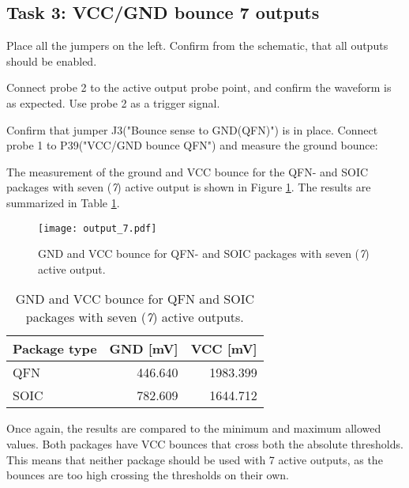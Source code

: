\documentclass[../main.tex]{subfiles}
\begin{document}
\subsection{Task 3: VCC/GND bounce 7 outputs}

Place all the jumpers on the left. Confirm from the schematic, that all outputs should be enabled.

\vspace{10pt}

Connect probe 2 to the active output probe point, and confirm the waveform is as expected. Use probe 2 as a trigger signal.

\vspace{10pt}

Confirm that jumper J3("Bounce sense to GND(QFN)") is in place. Connect probe 1 to P39("VCC/GND bounce QFN") and measure the ground bounce:

\solution

The measurement of the ground and VCC bounce for the QFN- and SOIC packages with seven (\textit{7}) active output is shown in Figure \ref{fig:gnd_vcc_output_7}. The results are summarized in Table \ref{tab:output_7}.

\begin{figure}[h]
    \centering
    \texttt{[image: output\_7.pdf]}
    \caption{GND and VCC bounce for QFN- and SOIC packages with seven (\textit{7}) active output.}
    \label{fig:gnd_vcc_output_7}
\end{figure}
\begin{table}[h]
    \centering
    \begin{tabular}{l | r r}
        \toprule[1pt]
        Package type    & GND [mV]  & VCC [mV]\\
        \midrule
        QFN             & 446.640   & 1983.399  \\
        SOIC            & 782.609   & 1644.712  \\
        \bottomrule[1pt]
    \end{tabular}
    \caption{GND and VCC bounce for QFN and SOIC packages with seven (\textit{7}) active outputs.}
    \label{tab:output_7}
\end{table}

Once again, the results are compared to the minimum and maximum allowed values. Both packages have VCC bounces that cross both the absolute thresholds. This means that neither package should be used with 7 active outputs, as the bounces are too high crossing the thresholds on their own.
\end{document}
